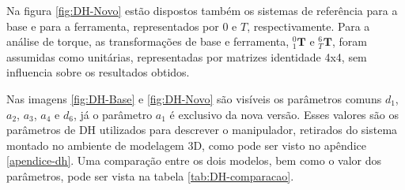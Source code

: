 Na figura \ref{fig:DH-Novo} estão dispostos também os sistemas de referência
para a base e para a ferramenta, representados por $0$ e $T$, respectivamente.
Para a análise de torque, as transformações de base e ferramenta, $^0_1\textbf{T}$ e $^6_T\textbf{T}$,
foram assumidas como unitárias, representadas por matrizes identidade 4x4,
sem influencia sobre os resultados obtidos.

Nas imagens \ref{fig:DH-Base} e \ref{fig:DH-Novo} são visíveis os parâmetros 
comuns $d_1$, $a_2$, $a_3$, $a_4$ e $d_6$, já o parâmetro $a_1$ é exclusivo da 
nova versão. 
Esses valores são os parâmetros de DH utilizados para descrever o manipulador,
retirados do sistema montado no ambiente de modelagem 3D, como pode ser visto no
apêndice \ref{apendice-dh}. 
Uma comparação entre os dois modelos, bem como o valor dos parâmetros, pode 
ser vista na tabela \ref{tab:DH-comparacao}.

